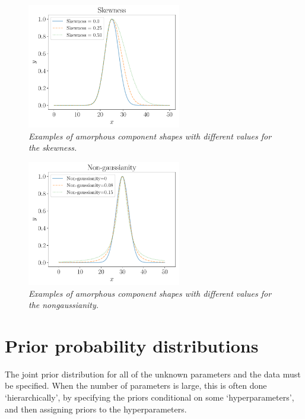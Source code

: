 \documentclass[preprint, a4paper]{elsarticle}
\begin{document}
\begin{figure}[!ht]
\centering
\includegraphics[width=0.6\textwidth]{figures/skewness.pdf}
\caption{\it Examples of amorphous component shapes with different values
for the skewness.\label{fig:skewness}}
\end{figure}

\begin{figure}[!ht]
\centering
\includegraphics[width=0.6\textwidth]{figures/nongaussianity.pdf}
\caption{\it Examples of amorphous component shapes with different values
for the nongaussianity.\label{fig:nongaussianity}}
\end{figure}

\section{Prior probability distributions}\label{sec:priors}
The joint prior distribution for all of the unknown parameters and
the data must be specified.
When the number of parameters is large, this is often done `hierarchically', by
specifying the priors conditional on some `hyperparameters', and then assigning
priors to the hyperparameters.
\end{document}
